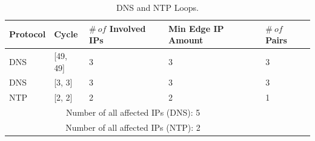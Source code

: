 \captionsetup{font=normalsize}
\begin{table}[t]
    \centering
    \caption{DNS and NTP Loops.}
    \normalsize
    \renewcommand{\arraystretch}{0.7} %
    \setlength{\tabcolsep}{1pt} %
    \begin{tabularx}{\columnwidth}{XXXXX}
    \toprule
    Protocol & Cycle & $\#\ of$ Involved IPs & Min Edge IP Amount & $\#\ of$ Pairs \\
    
    \midrule
    DNS & {[49, 49]} & 3 & 3 & 3 \\
    DNS & {[3, 3]} & 3 & 3 & 3 \\
    NTP & {[2, 2]} & 2 & 2 & 1 \\
    \midrule
    \multicolumn{4}{c}{Number of all affected IPs (DNS): 5} \\
    \multicolumn{4}{c}{Number of all affected IPs (NTP): 2}  \\
    \bottomrule
    \end{tabularx}
    \label{tab:loops}
\end{table}

\vspace{-5pt}

